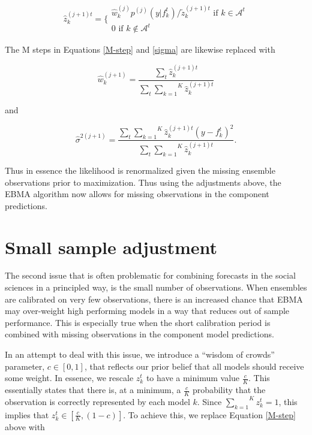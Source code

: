 \documentclass[12pt,fullpage,endnotes]{article}
\begin{document}
\begin{equation}
\hat{z}^{(j+1)t}_{k} = \Bigg\{ \begin{array}{c} {\hat{w}^{(j)}_k p^{(j)}(y|f_{k}^{t})}/{\tilde{z}_k^{(j+1)t} } \mbox{ if } k \in \mathcal{A}^t\\ 0 \mbox{ if } k \notin \mathcal{A}^t \end{array}
\end{equation}



\noindent  The M steps in Equations \ref{M-step} and \ref{sigma} are likewise replaced with

\begin{equation}
\hat{w}^{(j+1)}_k=\frac{\underset{t}{\sum}\hat{z}^{(j+1)t}_{k}}{\underset{t}{\sum}\overset{K}{\underset{k=1}{ \sum}} \hat{z}_k^{(j+1)t}}
\end{equation}


\noindent and

\begin{equation}
\hat{\sigma}^{2(j+1)}=\frac{\underset{t}{\sum}\overset{K}{\underset{k=1}{\sum}}\hat{z}^{(j+1)t}_{k}(y-f_{k}^{t})^2 }{\underset{t}{\sum}\overset{K}{\underset{k=1}{ \sum}} \hat{z}_k^{(j+1)t}}.
\end{equation}

Thus in essence the likelihood is renormalized given the missing ensemble observations prior to maximization. Thus using the adjustments above, the EBMA algorithm now allows for missing observations in the component predictions.

\section{Small sample adjustment}
\label{woc}
The second issue that is often problematic for combining forecasts in the social sciences in a principled way, is the small number of observations. When ensembles are calibrated on very few observations, there is an increased chance that EBMA may over-weight high performing models in a way that reduces out of sample performance. This is especially true when the short calibration period is combined with missing observations in the component model predictions. %

In an attempt to deal with this issue, we introduce a ``wisdom of crowds'' parameter, $c \in [0,1]$, that reflects our prior
belief that all models should receive some weight.  In essence, we
rescale $z^t_k$ to have a minimum value $\frac{c}{K}$.  This
essentially states that there is, at a minimum, a $\frac{c}{K}$
probability that the observation is correctly represented by each
model $k$.  Since $\overset{K}{\underset{k=1}{\sum}} z_k^t = 1$, this
implies that $z_k^t \in [\frac{c}{K}, (1-c)]$.  To achieve this, we
replace Equation \ref{M-step} above with
\end{document}
